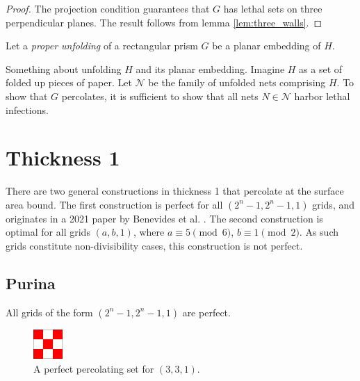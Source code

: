 \begin{proof}
The projection condition guarantees that $G$ has lethal sets on three perpendicular planes. The result follows from lemma \ref{lem:three_walls}.
\end{proof}

\begin{defn}
Let a \emph{proper unfolding} of a rectangular prism $G$ be a planar embedding of $H$.
\end{defn}

\begin{cor}
\label{cor:unfold}
Something about unfolding $H$ and its planar embedding. Imagine $H$ as a set of folded up pieces of paper. Let $\mathcal{N}$ be the family of unfolded nets comprising $H$. To show that $G$ percolates, it is sufficient to show that all nets $N \in \mathcal{N}$ harbor lethal infections.
\end{cor}

\section{Thickness 1}

There are two general constructions in thickness 1 that percolate at the surface area bound. The first construction is perfect for all $(2^n-1, 2^n-1, 1)$ grids, and originates in a 2021 paper by Benevides et al. \cite{benevides:2021}. The second construction is optimal for all grids $(a,b,1)$, where $a \equiv 5 \pmod 6$, $b \equiv 1 \pmod 2$. As such grids constitute non-divisibility cases, this construction is not perfect.

\subsection{Purina}

\begin{con}
\label{con:purina}
All grids of the form $(2^n-1, 2^n-1, 1)$ are perfect.
\end{con}

\begin{figure}[]
\centering
\includegraphics[width=0.1\textwidth]{figures/4/3x3x1.pdf}
\caption{A perfect percolating set for $(3,3,1)$.}
\label{fig:3x3x1}
\end{figure} 


